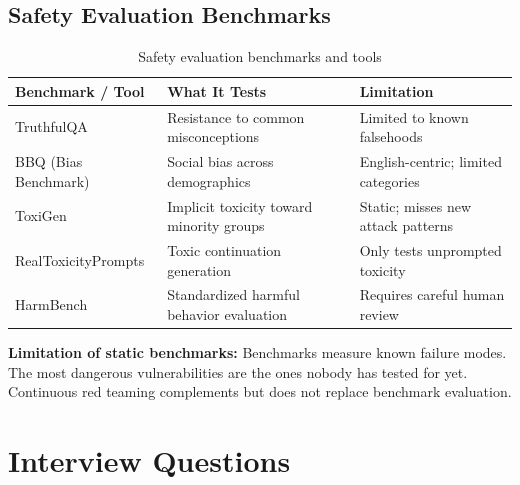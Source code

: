 \subsection{Safety Evaluation Benchmarks}

\begin{table}[H]
\centering
\caption{Safety evaluation benchmarks and tools}
\begin{tabularx}{\textwidth}{lXX}
\toprule
\textbf{Benchmark / Tool} & \textbf{What It Tests} & \textbf{Limitation} \\
\midrule
TruthfulQA & Resistance to common misconceptions & Limited to known falsehoods \\
BBQ (Bias Benchmark) & Social bias across demographics & English-centric; limited categories \\
ToxiGen & Implicit toxicity toward minority groups & Static; misses new attack patterns \\
RealToxicityPrompts & Toxic continuation generation & Only tests unprompted toxicity \\
HarmBench & Standardized harmful behavior evaluation & Requires careful human review \\
\bottomrule
\end{tabularx}
\end{table}

\textbf{Limitation of static benchmarks:} Benchmarks measure known failure modes. The most dangerous vulnerabilities are the ones nobody has tested for yet. Continuous red teaming complements but does not replace benchmark evaluation.

\section{Interview Questions}
\label{sec:safety_interview}


